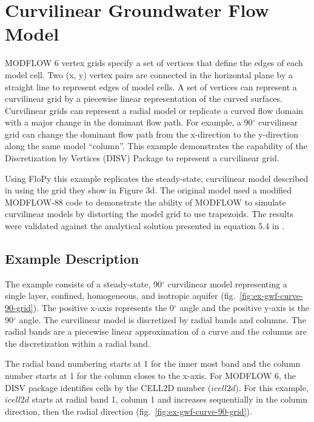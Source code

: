 \section{Curvilinear Groundwater Flow Model}
MODFLOW 6 vertex grids specify a set of vertices that define the edges of each model cell. Two (x, y) vertex pairs are connected in the horizontal plane by a straight line to represent edges of model cells. A set of vertices can represent a curvilinear grid \citep{romero2006grid} by a piecewise linear representation of the curved surfaces. Curvilinear grids can represent a radial model or replicate a curved flow domain with a major change in the dominant flow path. For example, a 90$^{\circ}$ curvilinear grid can change the dominant flow path from the x-direction to the y-direction along the same model ``column''.  This example demonstrates the capability of the Discretization by Vertices (DISV) Package to represent a curvilinear grid.

Using FloPy this example replicates the steady-state, curvilinear model described in \cite{romero2006grid} using the grid they show in Figure 3d. The original model used a modified MODFLOW-88 \citep{modflow88} code to demonstrate the ability of MODFLOW to simulate curvilinear models by distorting the model grid to use trapezoids. The results were validated against the analytical solution presented in equation 5.4 in \cite{crank1975diffusion}.


\subsection{Example Description}

The example consists of a steady-state, 90$^{\circ}$ curvilinear model representing a single layer, confined, homogeneous, and isotropic aquifer (fig.~\ref{fig:ex-gwf-curve-90-grid}). The positive x-axis represents the 0$^{\circ}$ angle and the positive y-axis is the 90$^{\circ}$ angle. The curvilinear model is discretized by radial bands and columns. The radial bands are a piecewise linear approximation of a curve and the columns are the discretization within a radial band.

The radial band numbering starts at 1 for the inner most band and the column number starts at 1 for the column closes to the x-axis. For MODFLOW 6, the DISV package identifies cells by the CELL2D number ($icell2d$). For this example, $icell2d$ starts at radial band 1, column 1 and increases sequentially in the column direction, then the radial direction (fig.~\ref{fig:ex-gwf-curve-90-grid}).

